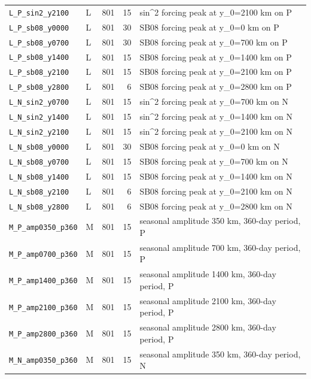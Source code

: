 {\begin{longtable}{llrrp{7.0cm}}
\texttt{L\_P\_sin2\_y2100} & L & 801 & 15 & sin\textasciicircum{}2 forcing peak at y\_0=2100 km on P\\
\texttt{L\_P\_sb08\_y0000} & L & 801 & 30 & SB08 forcing peak at y\_0=0 km on P\\
\texttt{L\_P\_sb08\_y0700} & L & 801 & 30 & SB08 forcing peak at y\_0=700 km on P\\
\texttt{L\_P\_sb08\_y1400} & L & 801 & 15 & SB08 forcing peak at y\_0=1400 km on P\\
\texttt{L\_P\_sb08\_y2100} & L & 801 & 15 & SB08 forcing peak at y\_0=2100 km on P\\
\texttt{L\_P\_sb08\_y2800} & L & 801 & 6 & SB08 forcing peak at y\_0=2800 km on P\\
\texttt{L\_N\_sin2\_y0700} & L & 801 & 15 & sin\textasciicircum{}2 forcing peak at y\_0=700 km on N\\
\texttt{L\_N\_sin2\_y1400} & L & 801 & 15 & sin\textasciicircum{}2 forcing peak at y\_0=1400 km on N\\
\texttt{L\_N\_sin2\_y2100} & L & 801 & 15 & sin\textasciicircum{}2 forcing peak at y\_0=2100 km on N\\
\texttt{L\_N\_sb08\_y0000} & L & 801 & 30 & SB08 forcing peak at y\_0=0 km on N\\
\texttt{L\_N\_sb08\_y0700} & L & 801 & 15 & SB08 forcing peak at y\_0=700 km on N\\
\texttt{L\_N\_sb08\_y1400} & L & 801 & 15 & SB08 forcing peak at y\_0=1400 km on N\\
\texttt{L\_N\_sb08\_y2100} & L & 801 & 6 & SB08 forcing peak at y\_0=2100 km on N\\
\texttt{L\_N\_sb08\_y2800} & L & 801 & 6 & SB08 forcing peak at y\_0=2800 km on N\\
\texttt{M\_P\_amp0350\_p360} & M & 801 & 15 & seasonal amplitude 350 km, 360-day period, P\\
\texttt{M\_P\_amp0700\_p360} & M & 801 & 15 & seasonal amplitude 700 km, 360-day period, P\\
\texttt{M\_P\_amp1400\_p360} & M & 801 & 15 & seasonal amplitude 1400 km, 360-day period, P\\
\texttt{M\_P\_amp2100\_p360} & M & 801 & 15 & seasonal amplitude 2100 km, 360-day period, P\\
\texttt{M\_P\_amp2800\_p360} & M & 801 & 15 & seasonal amplitude 2800 km, 360-day period, P\\
\texttt{M\_N\_amp0350\_p360} & M & 801 & 15 & seasonal amplitude 350 km, 360-day period, N\\

\end{longtable}}
